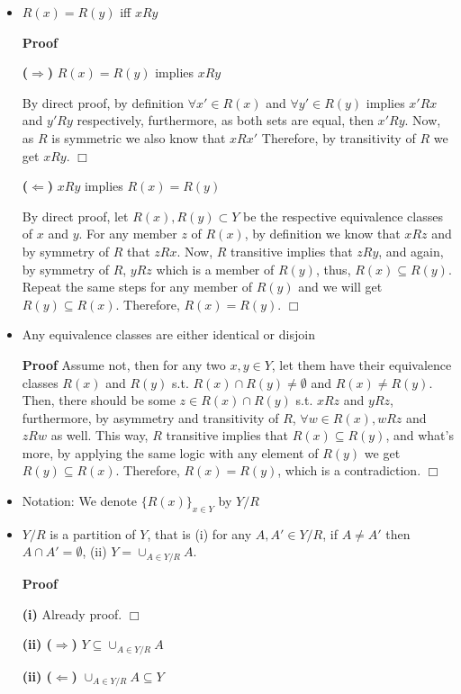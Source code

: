 \documentclass{article}
\theoremstyle{definition}
\begin{document}
\begin{itemize}
\item $R(x)=R(y)$ iff $xRy$

{\bf Proof}

{\bf ($\Rightarrow$)} $R(x)=R(y)$ implies $xRy$

By direct proof, by definition $\forall x' \in R(x)$ and $\forall y'\in R(y)$ implies $x'Rx$ and $y'Ry$ respectively, furthermore, as both sets are equal, then $x'Ry$. Now, as $R$ is symmetric we also know that $xRx'$ Therefore, by transitivity of $R$ we get $xRy$. $\Box$

{\bf ($\Leftarrow$)} $xRy$ implies $R(x)=R(y)$

By direct proof, let $R(x), R(y) \subset Y$ be the respective equivalence classes of $x$ and $y$. For any member $z$ of $R(x)$, by definition we know that $xRz$ and by symmetry of $R$ that $zRx$. Now, $R$ transitive implies that $zRy$, and again, by symmetry of $R$, $yRz$ which is a member of $R(y)$, thus, $R(x)\subseteq R(y)$. Repeat the same steps for any member of $R(y)$ and we will get $R(y)\subseteq R(x)$. Therefore, $R(x)=R(y)$. $\Box$

\item Any equivalence classes are either identical or disjoin

{\bf Proof} Assume not, then for any two $x,y\in Y$, let them have their equivalence classes $R(x)$ and $R(y)$ s.t. $R(x)\cap R(y)\not=\emptyset$ and $R(x)\not=R(y)$. Then, there should be some $z\in R(x)\cap R(y)$ s.t. $xRz$ and $yRz$, furthermore, by asymmetry and transitivity of $R$, $\forall w\in R(x), wRz$ and $zRw$ as well. This way, $R$ transitive implies that $R(x)\subseteq R(y)$, and what's more, by applying the same logic with any element of $R(y)$ we get $R(y)\subseteq R(x)$. Therefore, $R(x)=R(y)$, which is a contradiction. $\Box$

\item[] Notation: We denote $\{R(x)\}_{x\in Y}$ by $Y/R$
\item $Y/R$ is a partition of $Y$, that is (i) for any $A,A'\in Y/R$, if $A\not=A'$ then $A\cap A'=\emptyset$, (ii) $Y=\cup_{A\in Y/R}A$.

{\bf Proof}

{\bf (i)} Already proof. $\Box$

{\bf (ii) ($\Rightarrow$)} $Y\subseteq \cup_{A\in Y/R}A$

{\bf (ii) ($\Leftarrow$)} $\cup_{A\in Y/R}A \subseteq Y$


\end{itemize}
\end{document}
